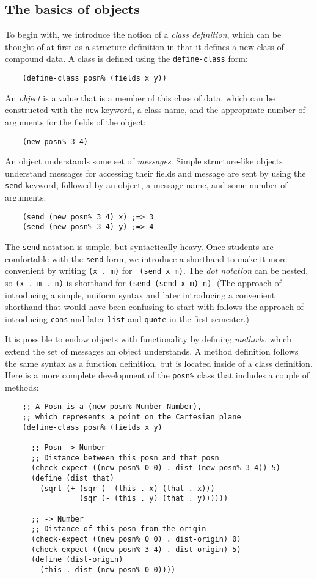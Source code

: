 \documentclass[submission,copyright]{eptcs}
\begin{document}
\subsection{The basics of objects}

To begin with, we introduce the notion of a \emph{class definition},
which can be thought of at first as a structure definition in that
it defines a new class of compound data.  A class is defined using the
{\tt define-class} form:
\begin{verbatim}
    (define-class posn% (fields x y))
\end{verbatim}
An \emph{object} is a value that is a member of this class of data,
which can be constructed with the {\tt new} keyword, a class name, and
the appropriate number of arguments for the fields of the object:
\begin{verbatim}
    (new posn% 3 4)
\end{verbatim}
An object understands some set of \emph{messages}.  Simple
structure-like objects understand messages for accessing their fields
and message are sent by using the {\tt send} keyword, followed by an object,
a message name, and some number of arguments:
\begin{verbatim}
    (send (new posn% 3 4) x) ;=> 3
    (send (new posn% 3 4) y) ;=> 4
\end{verbatim}
The {\tt send} notation is simple, but syntactically heavy.  Once
students are comfortable with the {\tt send} form, we introduce a
shorthand to make it more convenient by writing {\tt (x . m)} for {\tt
  (send x m)}.  The \emph{dot notation} can be nested, so {\tt (x . m
  . n)} is shorthand for {\tt (send (send x m) n)}.  (The approach of
introducing a simple, uniform syntax and later introducing a
convenient shorthand that would have been confusing to start with
follows the approach of introducing {\tt cons} and later {\tt list}
and {\tt quote} in the first semester.)


It is possible to endow objects with functionality by defining \emph{methods},
which extend the set of messages an object understands.  A method definition
follows the same syntax as a function definition, but is located inside of a
class definition.  Here is a more complete development of the {\tt posn\%} class
that includes a couple of methods:
\begin{verbatim}
    ;; A Posn is a (new posn% Number Number),
    ;; which represents a point on the Cartesian plane
    (define-class posn% (fields x y)

      ;; Posn -> Number
      ;; Distance between this posn and that posn
      (check-expect ((new posn% 0 0) . dist (new posn% 3 4)) 5)
      (define (dist that)
        (sqrt (+ (sqr (- (this . x) (that . x)))
                 (sqr (- (this . y) (that . y))))))

      ;; -> Number
      ;; Distance of this posn from the origin
      (check-expect ((new posn% 0 0) . dist-origin) 0)
      (check-expect ((new posn% 3 4) . dist-origin) 5)
      (define (dist-origin)
        (this . dist (new posn% 0 0))))
\end{verbatim}
\end{document}
